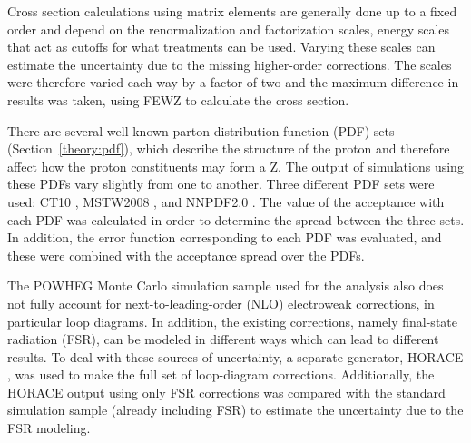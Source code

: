 
Cross section calculations using matrix elements 
are generally done up to a fixed order 
and depend on the renormalization and factorization scales, %
energy scales that act as cutoffs for what 
treatments can be used.  
Varying these scales can estimate the uncertainty due 
to the missing higher-order %
corrections. 
The scales were therefore varied each way by a factor of two 
and the maximum difference in results was taken, 
using FEWZ \cite{FEWZ2} to calculate the cross section.  %



There are several well-known
parton distribution function (PDF) sets
(Section~\ref{theory:pdf}), 
which describe the structure of the proton 
and therefore affect how the proton constituents 
may form a Z.  
The output of simulations
using these PDFs vary slightly from one to another.
Three different PDF sets were used: 
CT10 \cite{CT10}, MSTW2008 \cite{MSTW}, and NNPDF2.0 \cite{NNPDF}.  
The value of the acceptance with each PDF was calculated 
in order to determine the spread between the three sets.  
In addition, the error function corresponding to each PDF 
was evaluated, 
and these were combined with the acceptance spread 
over the PDFs.  



The POWHEG Monte Carlo simulation sample used for the analysis 
also does not fully account for next-to-leading-order (NLO) 
electroweak corrections, 
in particular loop diagrams.  
In addition, the existing corrections, 
namely final-state radiation (FSR), 
can be modeled in different ways 
which can lead to different results.  
To deal with these sources of uncertainty, 
a separate generator, HORACE \cite{horace1} \cite{horace2}, 
was used to make the full set of loop-diagram corrections.  
Additionally, the HORACE output using only FSR corrections 
was compared with the 
standard simulation sample 
(already including FSR) to estimate 
the uncertainty due to the FSR modeling.  


